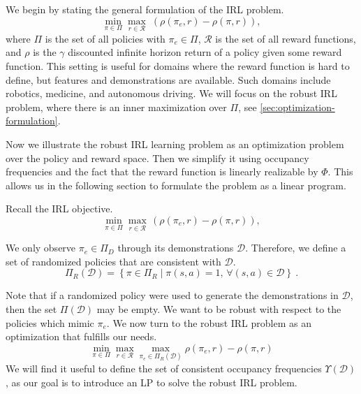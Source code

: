 \documentclass[10pt]{article}
\begin{document}
We begin by stating the general formulation of the IRL problem.
\begin{equation}
	\min_{\pi \in \Pi} \max_{r \in \mathcal{R}} \; (\rho(\pi_e, r) - \rho(\pi, r)),
\end{equation}
where $\Pi$ is the set of all policies with $\pi_e \in \Pi$, $\mathcal{R}$ is the set of all reward functions, and $\rho$ is the $\gamma$ discounted infinite horizon
return of a policy given some reward function. This setting is useful for domains where the reward function is hard to define, 
but features and demonstrations are available. Such domains include robotics, medicine, and autonomous driving. 
We will focus on the robust IRL problem, where there is an inner maximization over $\Pi$, see \cref{sec:optimization-formulation}.

Now we illustrate the robust IRL learning problem as an optimization problem over the policy and reward space. Then we simplify it using occupancy frequencies
and the fact that the reward function is linearly realizable by $\Phi$. This allows us in the following section to formulate the problem as a linear program.

Recall the IRL objective.
\begin{equation}
	\min_{\pi \in \Pi} \max_{r \in \mathcal{R}}  \, (\rho(\pi_e, r) - \rho(\pi, r)),
\end{equation}

We only observe $\pi_e \in \Pi_D$ through its demonstrations $\mathcal{D}$. Therefore, we define a set of randomized policies that are consistent with $\mathcal{D}$.
%
\begin{equation} \label{eq:consistent-policies}
	\Pi_R(\mathcal{D}) = \left\{ \pi \in \Pi_R \mid \pi(s,a) = 1, \, \forall (s,a) \in \mathcal{D} \right\}~.
\end{equation}

Note that if a randomized policy were used to generate the demonstrations in
$\mathcal{D}$, then the set $\Pi(\mathcal{D})$ may be empty. We want to be robust with respect to the policies which mimic $\pi_e$.
We now turn to the robust IRL problem as an optimization that fulfills our needs.
%
\begin{equation}
	\label{eq:robust_IRL_formulation}
	\min_{\pi \in \Pi} \max_{r \in \mathcal{R}} \max_{\pi_e \in \Pi_{R}(\mathcal{D})} \rho(\pi_e, r) - \rho(\pi, r)
\end{equation}
%
We will find it useful to define the set of consistent occupancy frequencies $\Upsilon(\mathcal{D})$, as our goal is to introduce an LP to solve
the robust IRL problem.
\end{document}
